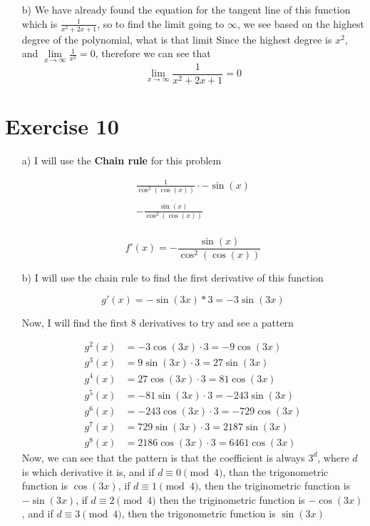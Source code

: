 \documentclass[11pt]{article}
\begin{document}
\begin{enumerate}
  \item[b)]
        We have already found the equation for the tangent line of this function which is $\frac{1}{x^{2}+2x+1}$, so to find the limit going to \(\infty\), we see based on the highest degree of the polynomial, what is that limit
        Since the highest degree is $x^{2}$, and $\lim\limits_{x \rightarrow \infty} \frac{1}{x^{2}} = 0$, therefore we can see that
        \[
          \lim\limits_{x \rightarrow \infty} \frac{1}{x^{2}+2x+1} = 0
        \]

\end{enumerate}
\section*{Exercise 10}
\begin{enumerate}
  \item[a)]
        I will use the \textbf{Chain rule} for this problem


\begin{gather*}
  \frac{1}{\cos^{2}(\cos(x))} \cdot -\sin(x) \\
  \\
  - \frac{\sin(x)}{\cos^{2}(\cos (x))} \\
\end{gather*}

        \[
          f'(x) = - \frac{\sin(x)}{\cos^{2}(\cos(x))}
        \]

  \item[b)]
        I will use the chain rule to find the first derivative of this function

        \[g'(x) = - \sin(3x) * 3 = -3\sin(3x)  \]

        Now, I will find the first 8 derivatives to try and see a pattern

\begin{align*}
  g^{2}(x) &= -3\cos(3x) \cdot 3 = -9\cos(3x) \\
  g^{3}(x) &= 9\sin(3x) \cdot 3 = 27\sin(3x) \\
  g^{4}(x) &= 27\cos(3x) \cdot 3 = 81\cos(3x) \\
  g^{5}(x) &= -81\sin(3x) \cdot 3 = -243\sin(3x) \\
  g^{6}(x) &= -243\cos(3x) \cdot 3 = -729\cos(3x) \\
  g^{7}(x) &= 729\sin(3x) \cdot 3 = 2187\sin(3x) \\
  g^{8}(x) &= 2186\cos(3x) \cdot 3 = 6461\cos(3x)
\end{align*}
        Now, we can see that the pattern is that the coefficient is always $3^{d}$, where $d$ is which derivative it is, and if $d \equiv 0 \pmod{4}$, than the trigonometric function is $\cos(3x)$,
        if $d \equiv 1 \pmod{4}$, then the triginometric function is $-\sin(3x)$,
        if $d \equiv 2 \pmod{4}$ then the triginometric function is $-\cos(3x)$,
        and if $d \equiv 3 \pmod{4}$, then the trigonometric function is $\sin(3x)$


\end{enumerate}
\end{document}
